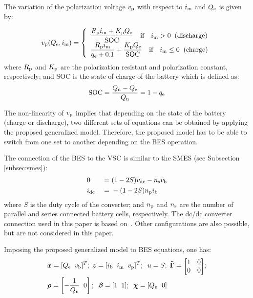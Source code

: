 \documentclass[journal, a4paper]{IEEEtran}
\begin{document}
The variation of the polarization voltage $v_{\rm p}$ with respect to
$i_{\rm m}$ and $Q_{\rm e}$ is given by:

\begin{equation}
  v_{\rm p}(Q_{\rm e}, i_{\rm m}) = \left\{ \begin{array}{l}
    \displaystyle \frac{R_{\rm p} i_{\rm m} + K_{\rm p} Q_{\rm e}}{\rm
      SOC} \quad \text{if} \quad i_{\rm m} > 0 \; \;
    \text{(discharge)}\\ \displaystyle \frac{R_{\rm p} i_{\rm
        m}}{q_{\rm e} + 0.1} + \frac{K_{\rm p} Q_{\rm e}}{\rm SOC}
    \quad \text{if} \quad i_{\rm m} \leq 0 \; \; \text{(charge)}\\
    \end{array} \right. 
\end{equation}
where $R_{\rm p}$ and $K_{\rm p}$ are the polarization resistant and
polarization constant, respectively; and SOC is the state of charge of
the battery which is defined as:
\begin{equation}
  \text{SOC} = \frac{Q_{\rm n} - Q_{\rm e}}{Q_{\rm n}} = 1 - q_{\rm e}
\end{equation}

The non-linearity of $v_{\rm p}$ implies that depending on the state
of the battery (charge or discharge), two different sets of equations
can be obtained by applying the proposed generalized model.
Therefore, the proposed model has to be able to switch from one set to
another depending on the BES operation.

The connection of the BES to the VSC is similar to the
SMES (see Subsection \ref{subsec:smes}):
\begin{alignat}{3}
  \nonumber & 0 &=& \ (1 - 2S) v_{\rm dc} - n_{\rm s} v_{\rm b} \\
  \label{bessvsc}	
  & i_{\rm dc} \ &=&\  - (1 - 2S) n_{\rm p} i_{\rm b}
\end{alignat}
where $S$ is the duty cycle of the converter; and $n_{\rm p}$ and
$n_{\rm s}$ are the number of parallel and series connected battery
cells, respectively. The dc/dc converter connection used in this
  paper is based on~\cite{esmaili:13}.  Other configurations are also
  possible, but are not considered in this paper.

Imposing the proposed generalized model to BES equations, one has:
\begin{alignat}{3}
  \nonumber &\boldsymbol{x} = [Q_{\rm e} \; \; v_{\rm b}]^T; \;
  \boldsymbol{z} = [i_{\rm b} \; \; i_{\rm m} \; \; v_{\rm p}]^T;
  \; \; u = S; \; \tilde{\mathbf{\Gamma}} =
     {\scriptscriptstyle{\begin{bmatrix} 1 & 0 \\ 0 &
           0 \end{bmatrix}}} ; \\ &\boldsymbol{\rho} =
     \left[-\frac{1}{Q_{\rm n}} \; \; 0 \right]; \; \;
     \boldsymbol{\beta} = [1 \; \; 1]; \; \; \boldsymbol{\chi}
     = [Q_{\rm n} \; \; 0]
\end{alignat}
\end{document}
